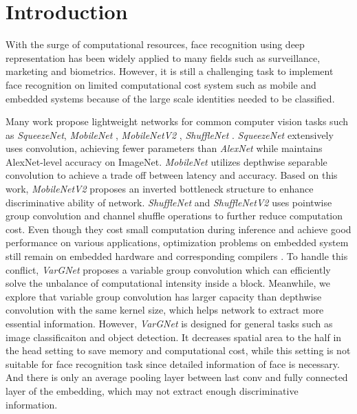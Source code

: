 \documentclass[10pt,twocolumn,letterpaper]{article}
\begin{document}
\section{Introduction}

With the surge of computational resources, face recognition using deep representation has been widely applied to many fields such as surveillance, marketing and biometrics\cite{arcface,sphereface}. However, it is still a challenging task to implement face recognition on limited computational cost system such as mobile and embedded systems because of the large scale identities needed to be classified.

Many work propose lightweight networks for common computer vision tasks such as \textit{SqueezeNet}\cite{iandola2016squeezenet}, \textit{MobileNet} \cite{mobilenet}, \textit{MobileNetV2} \cite{mobilenetv2}, \textit{ShuffleNet} \cite{shufflenet}. \textit{SqueezeNet}\cite{iandola2016squeezenet} extensively uses  convolution, achieving  fewer parameters than \textit{AlexNet}\cite{alexnet} while maintains AlexNet-level accuracy on ImageNet. \textit{MobileNet}\cite{mobilenet} utilizes depthwise separable convolution to achieve a trade off between latency and accuracy. Based on this work, \textit{MobileNetV2}\cite{mobilenetv2}  proposes an inverted bottleneck structure to enhance discriminative ability of network. \textit{ShuffleNet}\cite{shufflenet} and  \textit{ShuffleNetV2}\cite{shufflenetv2} uses pointwise group convolution and channel shuffle operations to further reduce computation cost. Even though they cost small computation during inference and achieve good performance on various applications, optimization problems on embedded system still remain on embedded hardware and corresponding compilers \cite{vargnet}. To handle this conflict, \textit{VarGNet} \cite{vargnet} proposes a variable group convolution which can efficiently solve the unbalance of computational intensity inside a block. Meanwhile, we explore that variable group convolution has larger capacity than depthwise convolution with the same kernel size, which helps network to extract more essential information. However, \textit{VarGNet} is designed for general tasks such as image classificaiton and object detection. It decreases spatial area to the half in the head setting to save memory and computational cost, while this setting is not suitable for face recognition task since detailed information of face is necessary. And there is only an average pooling layer between last conv and fully connected layer of the embedding, which may not extract enough discriminative information.
\end{document}
